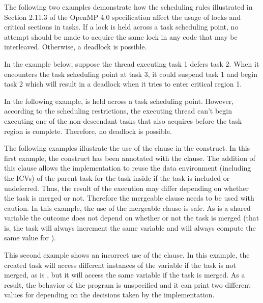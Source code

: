 The following two examples demonstrate how the scheduling rules illustrated in 
Section 2.11.3 of the OpenMP 4.0 specification affect the usage of locks 
and critical sections in tasks.  If a lock is held 
across a task scheduling point, no attempt should be made to acquire the same lock 
in any code that may be interleaved.  Otherwise, a deadlock is possible.

In the example below, suppose the thread executing task 1 defers task 2.  When 
it encounters the task scheduling point at task 3, it could suspend task 1 and 
begin task 2 which will result in a deadlock when it tries to enter critical region 
1.




In the following example,  is held across a task scheduling point. 
 However, according to the scheduling restrictions, the executing thread can't 
begin executing one of the non-descendant tasks that also acquires  before 
the task region is complete.  Therefore, no deadlock is possible.




The following examples illustrate the use of the  clause in the 
 construct. In this first example, the  construct has 
been annotated with the   clause. The addition of this clause 
allows the implementation to reuse the data environment (including the ICVs) of 
the parent task for the task inside  if the task is included or undeferred. 
Thus, the result of the execution may differ depending on whether the task is merged 
or not. Therefore the mergeable clause needs to be used with caution. In this example, 
the use of the mergeable clause is safe. As  is a shared variable the 
outcome does not depend on whether or not the task is merged (that is, the task 
will always increment the same variable and will always compute the same value 
for ).



This second example shows an incorrect use of the  clause. In 
this example, the created task will access different instances of the variable 
 if the task is not merged, as  is , but 
it will access the same variable  if the task is merged. As a result, 
the behavior of the program is unspecified and it can print two different values 
for  depending on the decisions taken by the implementation.

